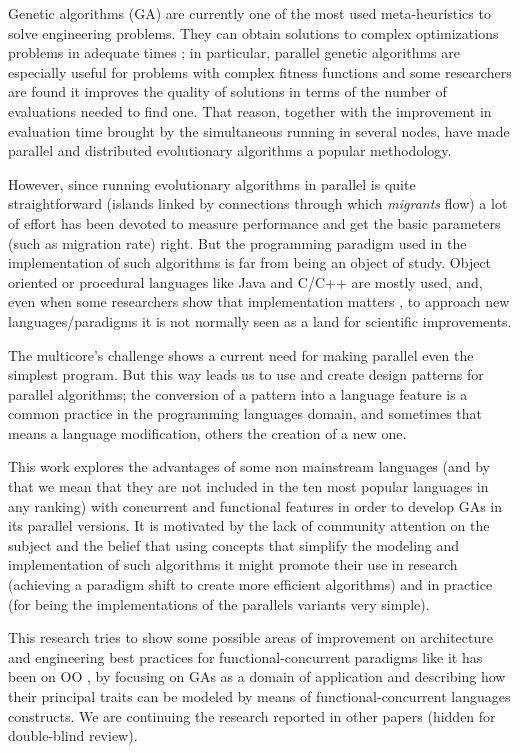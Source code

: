 
\noindent Genetic algorithms (GA) \cite{GA_Goldberg89} are currently one of the most used meta-heuristics to solve engineering problems. They can obtain solutions to complex optimizations problems in adequate times \cite{Luque2011}; in particular, parallel genetic algorithms are especially useful for problems with complex fitness functions and some researchers are found \cite{Alba2001} it improves the quality of solutions in terms of the number of evaluations needed to find one. That reason, together with the improvement in evaluation time brought by the simultaneous running in several nodes, have made parallel and distributed evolutionary algorithms a popular methodology.

However, since running evolutionary algorithms in parallel is quite straightforward (islands linked by connections through which {\em migrants} flow) a lot of effort has been devoted to measure performance and get the basic parameters (such as migration rate) right. But the programming paradigm used in the implementation of such algorithms is far from being an object of study. Object oriented or procedural languages like Java and C/C++ are mostly used, and, even when some researchers show that implementation matters \cite{DBLP:conf/iwann/MereloRACML11}, to approach new languages/paradigms it is not normally seen as a land for scientific improvements.

The multicore’s challenge \cite{SutterL05} shows a current need for making parallel even the simplest program. But this way leads us to use and create design patterns for parallel algorithms; the conversion of a pattern into a language feature is a common practice in the programming languages domain, and sometimes that means a language modification, others the creation of a new one.

This work explores the advantages of some non mainstream languages (and by that we mean that they are not included in the ten most popular languages in any ranking) with concurrent and functional features in order to develop GAs in its parallel versions. It is motivated by the lack of community attention on the subject and the belief that using concepts that simplify the modeling and implementation of such algorithms it might promote their use in research (achieving a paradigm shift to create more efficient algorithms) and in practice (for being the implementations of the parallels variants very simple).

This research tries to show some possible areas of improvement on architecture and engineering best practices for functional-concurrent paradigms like it has been on OO \cite{EO:FEA2000}, by focusing on GAs as a domain of application and describing how their principal traits can be modeled by means of functional-concurrent languages constructs. We are continuing the research reported in
other papers (hidden for double-blind review).

